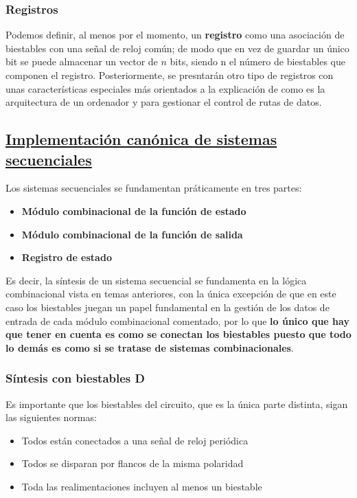 \documentclass[a4paper,10pt]{book}
\begin{document}
\subsubsection*{Registros}
Podemos definir, al menos por el momento, un \textbf{registro} como una asociación de biestables con una señal de reloj común; de modo que en vez de guardar un único bit se puede almacenar un vector de $n$ bits, siendo n el número de biestables que componen el registro. Posteriormente, se presntarán otro tipo de registros con unas características especiales más orientados a la explicación de como es la arquitectura de un ordenador y para gestionar el control de rutas de datos.

\subsection*{\underline{Implementación canónica de sistemas secuenciales}}
Los sistemas secuenciales se fundamentan práticamente en tres partes:
\begin{itemize}
\item \textbf{Módulo combinacional de la función de estado}
\item \textbf{Módulo combinacional de la función de salida}
\item \textbf{Registro de estado}
\end{itemize}

Es decir, la síntesis de un sistema secuencial se fundamenta en la lógica combinacional vista en temas anteriores, con la única excepción de que en este caso los biestables juegan un papel fundamental en la gestión de los datos de entrada de cada módulo combinacional comentado, por lo que \textbf{lo único que hay que tener en cuenta es como se conectan los biestables puesto que todo lo demás es como si se tratase de sistemas combinacionales}.

\subsubsection*{Síntesis con biestables D}
Es importante que los biestables del circuito, que es la única parte distinta, sigan las siguientes normas:
\begin{itemize}
\item Todos están conectados a una señal de reloj periódica
\item Todos se disparan por flancos de la misma polaridad
\item Toda las realimentaciones incluyen al menos un biestable
\end{itemize}
\end{document}
